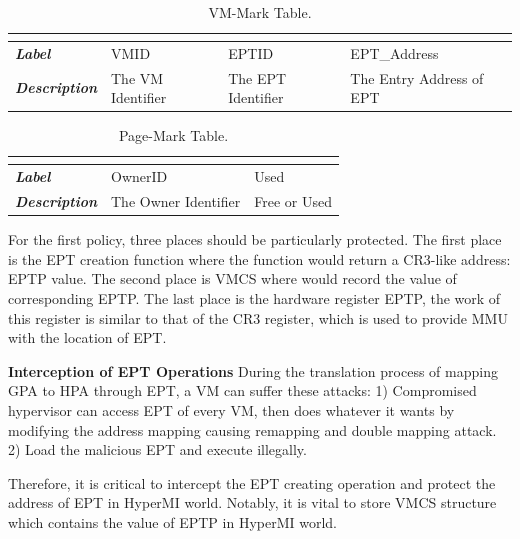\documentclass[conference]{IEEEtran}
\begin{document}
\begin{table}[htbp]
\centering
\caption{VM-Mark Table.}\label{tab1}
\begin{tabular}{p{1.4cm}|p{1.2cm}|p{1.1cm}|p{1.7cm}}
\hline
\multicolumn{4}{c}{\bfseries\textbf\centering{VM-Mark Table}}\\
\hline
{\itshape\bfseries Label} & VMID & EPTID & EPT\_Address\\
\hline
{\itshape\bfseries Description} & { The VM Identifier} & The EPT Identifier & The Entry Address of EPT\\
\hline
\end{tabular}
\end{table}

\begin{table}
\centering
\caption{Page-Mark Table.}\label{tab2}
\begin{tabular}{p{1.2cm}|p{1.4cm}|p{1.5cm}}
\hline
\multicolumn{3}{c}{\bfseries\textbf\centering{Page-Mark Table}}\\
\hline
{\itshape\bfseries Label} & OwnerID & Used \\
\hline
{\itshape\bfseries Description} & The Owner Identifier & Free or Used \\
\hline
\end{tabular}
\end{table}

For the first policy, three places should be particularly protected. The first place is the EPT creation function where the function would return a CR3-like address: EPTP value. The second place is VMCS where would record the value of corresponding EPTP. The last place is the hardware register EPTP, the work of this register is similar to that of the CR3 register, which is used to provide MMU with the location of EPT. 

\textbf{Interception of EPT Operations }
During the translation process of mapping GPA to HPA through EPT, a VM can suffer these attacks: 1) Compromised hypervisor can access EPT of every VM, then does whatever it wants by modifying the address mapping causing remapping and double mapping attack. 2) Load the malicious EPT and execute illegally.



Therefore, it is critical to intercept the EPT creating operation and protect the address of EPT in HyperMI world. Notably, it is vital to store VMCS structure which contains the value of EPTP in HyperMI world. 
\end{document}

